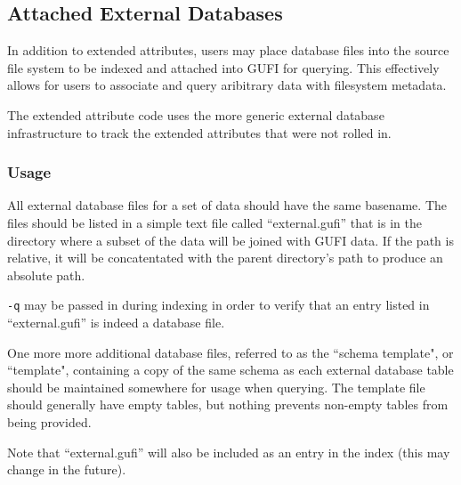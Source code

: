 \subsection{Attached External Databases}
In addition to extended attributes, users may place \sqlite database
files into the source file system to be indexed and attached into GUFI
for querying. This effectively allows for users to associate and
query aribitrary data with filesystem metadata.

The extended attribute code uses the more generic external database
infrastructure to track the extended attributes that were not rolled
in.

\subsubsection{Usage}
All external database files for a set of data should have the same
basename. The files should be listed in a simple text file called
``external.gufi'' that is in the directory where a subset of the data
will be joined with GUFI data. If the path is relative, it will be
concatentated with the parent directory's path to produce an absolute
path.

\texttt{-q} may be passed in during indexing in order to verify that
an entry listed in ``external.gufi'' is indeed a database file.

One more more additional database files, referred to as the
``schema template", or ``template", containing a copy of the same
schema as each external database table should be maintained somewhere
for usage when querying. The template file should generally have empty
tables, but nothing prevents non-empty tables from being provided.

Note that ``external.gufi'' will also be included as an entry in the
index (this may change in the future).
